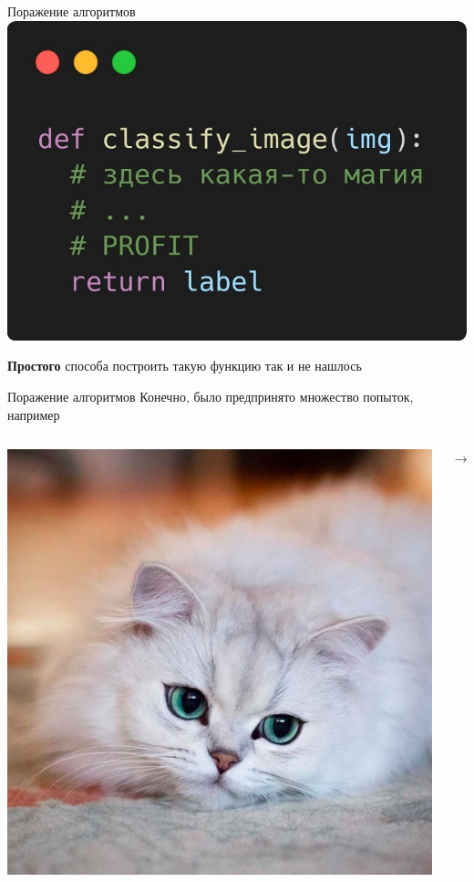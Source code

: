 \documentclass[aspectratio=169, professionalfonts]{beamer}
\begin{document}
\begin{frame}{Поражение алгоритмов}
    \centering
    \includegraphics[width=.5\linewidth]{graphs/fig9_2.jpg}

    \textbf{Простого} способа построить такую функцию так и не нашлось
\end{frame}

\begin{frame}{Поражение алгоритмов}
    Конечно, было предпринято множество попыток, например
    \vfill
    \begin{columns}
        \begin{column}{.25\linewidth}
            \includegraphics[width=\linewidth]{graphs/fig8.jpg}
        \end{column}
        \begin{column}{.15\linewidth}
            \centering
            \( \longrightarrow \) \\

\end{column}
\end{columns}
\end{frame}
\end{document}
